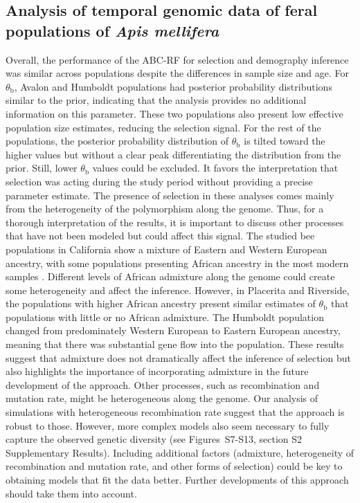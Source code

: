 \documentclass[a4paper, 12pt]{article}
\begin{document}
\subsection*{Analysis of temporal genomic data of feral populations of \textit{Apis mellifera}}

Overall, the performance of the ABC-RF for selection and demography inference was similar across populations despite the differences in sample size and age. For $\theta_{\mathrm{b}}$, Avalon and Humboldt populations had posterior probability distributions similar to the prior, indicating that the analysis provides no additional information on this parameter. These two populations also present low effective population size estimates, reducing the selection signal. For the rest of the populations, the posterior probability distribution of $\theta_{\mathrm{b}}$ is tilted toward the higher values but without a clear peak differentiating the distribution from the prior. Still, lower $\theta_{\mathrm{b}}$ values could be excluded. It favors the interpretation that selection was acting during the study period without providing a precise parameter estimate. The presence of selection in these analyses comes mainly from the heterogeneity of the polymorphism along the genome. Thus, for a thorough interpretation of the results, it is important to discuss other processes that have not been modeled but could affect this signal.
The studied bee populations in California show a mixture of Eastern and Western European ancestry, with some populations presenting African ancestry in the most modern samples \citet{Cridland:2018fx}. Different levels of African admixture along the genome could create some heterogeneity and affect the inference. However, in Placerita and Riverside, the populations with higher African ancestry present similar estimates of $\theta_{\mathrm{b}}$ that populations with little or no African admixture. The Humboldt population changed from predominately Western European to Eastern European ancestry, meaning that there was substantial gene flow into the population. These results suggest that admixture does not dramatically affect the inference of selection but also highlights the importance of incorporating admixture in the future development of the approach. Other processes, such as recombination and mutation rate, might be heterogeneous along the genome. Our analysis of simulations with heterogeneous recombination rate suggest that the approach is robust to those. However, more complex models also seem necessary to fully capture the observed genetic diversity (see Figures~S7-S13, section S2 Supplementary Results). Including additional factors (admixture, heterogeneity of recombination and mutation rate, and other forms of selection) could be key to obtaining models that fit the data better. Further developments of this approach should take them into account.
\end{document}
